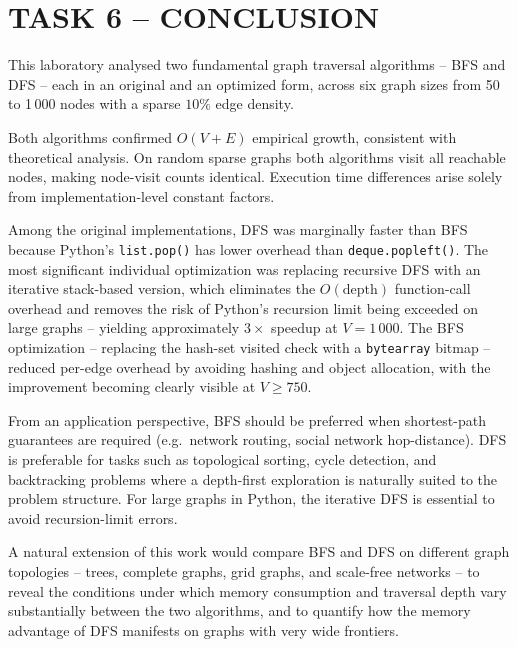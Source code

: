 \documentclass[12pt,a4paper]{article}
\begin{document}
	\section{TASK 6 -- CONCLUSION}
	
	This laboratory analysed two fundamental graph traversal algorithms -- BFS and DFS
	-- each in an original and an optimized form, across six graph sizes from 50 to
	1\,000 nodes with a sparse $10\%$ edge density.
	
	Both algorithms confirmed $O(V+E)$ empirical growth, consistent with theoretical
	analysis. On random sparse graphs both algorithms visit all reachable nodes, making
	node-visit counts identical. Execution time differences arise solely from
	implementation-level constant factors.
	
	Among the original implementations, DFS was marginally faster than BFS because
	Python's \texttt{list.pop()} has lower overhead than \texttt{deque.popleft()}.
	The most significant individual optimization was replacing recursive DFS with an
	iterative stack-based version, which eliminates the $O(\text{depth})$ function-call
	overhead and removes the risk of Python's recursion limit being exceeded on large
	graphs -- yielding approximately $3\times$ speedup at $V = 1\,000$. The BFS
	optimization -- replacing the hash-set visited check with a \texttt{bytearray}
	bitmap -- reduced per-edge overhead by avoiding hashing and object allocation,
	with the improvement becoming clearly visible at $V \geq 750$.
	
	From an application perspective, BFS should be preferred when shortest-path
	guarantees are required (e.g.\ network routing, social network hop-distance). DFS
	is preferable for tasks such as topological sorting, cycle detection, and
	backtracking problems where a depth-first exploration is naturally suited to the
	problem structure. For large graphs in Python, the iterative DFS is essential to
	avoid recursion-limit errors.
	
	A natural extension of this work would compare BFS and DFS on different graph
	topologies -- trees, complete graphs, grid graphs, and scale-free networks -- to
	reveal the conditions under which memory consumption and traversal depth vary
	substantially between the two algorithms, and to quantify how the memory advantage
	of DFS manifests on graphs with very wide frontiers.
	
\end{document}
